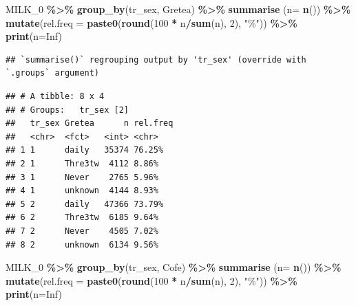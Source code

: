 \documentclass[
]{article}
\newenvironment{Shaded}{\begin{snugshade}}{\end{snugshade}}
\newcommand{\DataTypeTok}[1]{\textcolor[rgb]{0.13,0.29,0.53}{#1}}
\newcommand{\DecValTok}[1]{\textcolor[rgb]{0.00,0.00,0.81}{#1}}
\newcommand{\KeywordTok}[1]{\textcolor[rgb]{0.13,0.29,0.53}{\textbf{#1}}}
\newcommand{\NormalTok}[1]{#1}
\newcommand{\OperatorTok}[1]{\textcolor[rgb]{0.81,0.36,0.00}{\textbf{#1}}}
\newcommand{\OtherTok}[1]{\textcolor[rgb]{0.56,0.35,0.01}{#1}}
\newcommand{\StringTok}[1]{\textcolor[rgb]{0.31,0.60,0.02}{#1}}
\begin{document}
\begin{Shaded}
\begin{Highlighting}[]
\NormalTok{MILK\_}\DecValTok{0} \OperatorTok{\%\textgreater{}\%}\StringTok{ }
\StringTok{  }\KeywordTok{group\_by}\NormalTok{(tr\_sex, Gretea) }\OperatorTok{\%\textgreater{}\%}\StringTok{ }
\StringTok{  }\KeywordTok{summarise}\NormalTok{ (}\DataTypeTok{n=} \KeywordTok{n}\NormalTok{()) }\OperatorTok{\%\textgreater{}\%}
\StringTok{  }\KeywordTok{mutate}\NormalTok{(}\DataTypeTok{rel.freq =} \KeywordTok{paste0}\NormalTok{(}\KeywordTok{round}\NormalTok{(}\DecValTok{100} \OperatorTok{*}\StringTok{ }\NormalTok{n}\OperatorTok{/}\KeywordTok{sum}\NormalTok{(n), }\DecValTok{2}\NormalTok{), }\StringTok{"\%"}\NormalTok{))  }\OperatorTok{\%\textgreater{}\%}\StringTok{ }
\StringTok{  }\KeywordTok{print}\NormalTok{(}\DataTypeTok{n=}\OtherTok{Inf}\NormalTok{)}
\end{Highlighting}
\end{Shaded}

\begin{verbatim}
## `summarise()` regrouping output by 'tr_sex' (override with `.groups` argument)
\end{verbatim}

\begin{verbatim}
## # A tibble: 8 x 4
## # Groups:   tr_sex [2]
##   tr_sex Gretea      n rel.freq
##   <chr>  <fct>   <int> <chr>   
## 1 1      daily   35374 76.25%  
## 2 1      Thre3tw  4112 8.86%   
## 3 1      Never    2765 5.96%   
## 4 1      unknown  4144 8.93%   
## 5 2      daily   47366 73.79%  
## 6 2      Thre3tw  6185 9.64%   
## 7 2      Never    4505 7.02%   
## 8 2      unknown  6134 9.56%
\end{verbatim}

\begin{Shaded}
\begin{Highlighting}[]
\NormalTok{MILK\_}\DecValTok{0} \OperatorTok{\%\textgreater{}\%}\StringTok{ }
\StringTok{  }\KeywordTok{group\_by}\NormalTok{(tr\_sex, Cofe) }\OperatorTok{\%\textgreater{}\%}\StringTok{ }
\StringTok{  }\KeywordTok{summarise}\NormalTok{ (}\DataTypeTok{n=} \KeywordTok{n}\NormalTok{()) }\OperatorTok{\%\textgreater{}\%}
\StringTok{  }\KeywordTok{mutate}\NormalTok{(}\DataTypeTok{rel.freq =} \KeywordTok{paste0}\NormalTok{(}\KeywordTok{round}\NormalTok{(}\DecValTok{100} \OperatorTok{*}\StringTok{ }\NormalTok{n}\OperatorTok{/}\KeywordTok{sum}\NormalTok{(n), }\DecValTok{2}\NormalTok{), }\StringTok{"\%"}\NormalTok{))  }\OperatorTok{\%\textgreater{}\%}\StringTok{ }
\StringTok{  }\KeywordTok{print}\NormalTok{(}\DataTypeTok{n=}\OtherTok{Inf}\NormalTok{)}
\end{Highlighting}
\end{Shaded}
\end{document}
